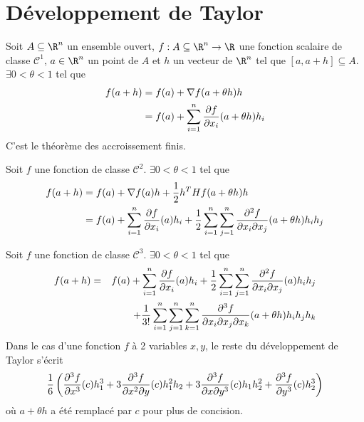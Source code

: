 
\section{Développement de Taylor}

\begin{myform}
	Soit $A \subseteq \R^n$ un ensemble ouvert, $f : A \subseteq \R^n \to \R$ une fonction scalaire de classe $\mathcal{C}^1$, $a \in \R^n$ un point de $A$ et $h$ un vecteur de $\R^n$ tel que $[a, a+h] \subseteq A$. $\exists 0 < \theta < 1$ tel que
	\begin{align*}
		f(a+h) & = f(a) + \nabla f(a+\theta h)h \\
		& = f(a) + \sum_{i =1}^n \frac{\partial f}{\partial x_i} (a+\theta h)h_i
	\end{align*}
	C'est le théorème des accroissement finis.
\end{myform}

\begin{myform}
	Soit $f$ une fonction de classe $\mathcal{C}^2$.
	$\exists 0 < \theta < 1$ tel que
	\begin{align*} f(a+h) & = f(a) + \nabla f(a) h + \frac12 h^T Hf(a+\theta h) h \\
		& = f(a) + \sum_{i=1}^n \frac{\partial f}{\partial x_i}(a)h_i + \frac12 \sum_{i=1}^n \sum_{j=1}^n \frac{\partial^2 f}{\partial x_i \partial x_j} (a+ \theta h) h_i h_j
	\end{align*}
\end{myform}

\begin{myform}
	Soit $f$ une fonction de classe $\mathcal{C}^3$.
	$\exists 0 < \theta < 1$ tel que
	\begin{eqnarray*}
		f(a+h) &=& f(a) + \sum_{i=1}^n \frac{\partial f}{\partial x_i}(a)h_i
		+ \frac 12 \sum_{i=1}^n \sum_{j=1}^n \frac{\partial^2 f}{\partial x_i \partial x_j} (a) h_i h_j \\
		&& + \frac{1}{3!} \sum_{i=1}^n \sum_{j=1}^n \sum_{k=1}^n \frac{\partial^3 f}{\partial x_i \partial x_j \partial x_k}(a+\theta h)h_i h_j h_k
	\end{eqnarray*}
	Dans le cas d'une fonction $f$ à 2 variables $x, y$, le reste du développement de Taylor s'écrit
	\[
	\frac{1}{6}
	\left(
	\frac{\partial^3 f}{\partial x^3}(c)h_1^3
	+ 3\frac{\partial^3 f}{\partial x^2\partial y}(c)h_1^2h_2\\
	+ 3\frac{\partial^3 f}{\partial x\partial y^3}(c)h_1h_2^2
	+ \frac{\partial^3 f}{\partial y^3}(c)h_2^3
	\right)
	\]
	où $a + \theta h$ a été remplacé par $c$ pour plus de concision.
\end{myform}

